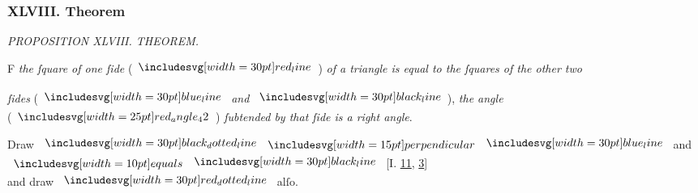 \documentclass[11pt,preview]{standalone}
\begin{document}
\subsubsection{XLVIII. Theorem}

\begin{minipage}[t]{0.54\textwidth}
    \begin{center}
        \textit{PROPOSITION XLVIII. THEOREM.}\label{book1pr48} \\
    \end{center}

    \hfill

    \begin{center}
        \raggedright \lettrine[lines=3, loversize=1, nindent=0pt]{}{}F \textit{the ſquare of one ſide} (\hspace{-1ex}$\redline$\hspace{-1ex}) \textit{of a triangle is equal to the ſquares of the other two}
    \end{center}
    \raggedright \textit{ſides} (\hspace{-1ex}$\blueline$ \textit{and} $\blackline$\hspace{-1ex}), \textit{the angle}\\ (\hspace{-1ex}$\img{red_angle_42}$\hspace{-1ex}) \textit{ſubtended by that ſide is a right angle}.
\end{minipage}%
\hfill
\begin{minipage}[t]{0.43\textwidth}
    \vspace{20pt}
    
\end{minipage}%

\hfill

{\vspace{1ex}\begin{center}
        Draw $\dottedblackline \bperp \blueline$ and $\bequals \blackline$ [\textsc{I.} \hyperref[book1pr11]{11}, \hyperref[book1pr3]{3}]\\
        and draw $\dottedredline$ alſo.
    \end{center}}
\end{document}
